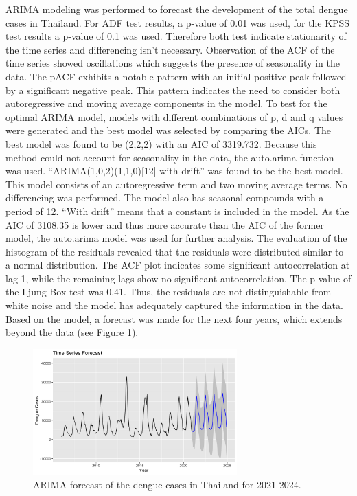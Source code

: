 	ARIMA modeling was performed to forecast the development of the total dengue cases in Thailand. For ADF test results, a p-value of 0.01 was used, for the KPSS test results a p-value of 0.1 was used. Therefore both test indicate stationarity of the time series and differencing isn’t necessary. Observation of the ACF of the time series showed oscillations which suggests the presence of seasonality in the data. The pACF exhibits a notable pattern with an initial positive peak followed by a significant negative peak. This pattern indicates the need to consider both autoregressive and moving average components in the model.
	To test for the optimal ARIMA model, models with different combinations of p, d and q values were generated and the best model was selected by comparing the AICs. The best model was found to be (2,2,2) with an AIC of 3319.732. Because this method could not account for seasonality in the data, the auto.arima function was used. “ARIMA(1,0,2)(1,1,0)[12] with drift” was found to be the best model. This model consists of an autoregressive term and two moving average terms. No differencing was performed. The model also has seasonal compounds with a period of 12. “With drift” means that a constant is included in the model. As the AIC of 3108.35 is lower and thus more accurate than the AIC of the former model, the auto.arima model was used for further analysis. 
	The evaluation of the histogram of the residuals revealed that the residuals were distributed similar to a normal distribution. The ACF plot indicates some significant autocorrelation at lag 1, while the remaining lags show no significant autocorrelation. The p-value of the Ljung-Box test was 0.41. Thus, the residuals are not distinguishable from white noise and the model has adequately captured the information in the data. 
	Based on the model, a forecast was made for the next four years, which extends beyond the data (see Figure \ref{fig:Auto_ARIMA_forecast}). 
	
		\begin{figure}[hbpt] 
		\centering
		\includegraphics[width=0.7\textwidth]{fig/Auto_ARIMA_forecast.png}
		\caption{ARIMA forecast of the dengue cases in Thailand for 2021-2024.}
		\label{fig:Auto_ARIMA_forecast}
	\end{figure}
 
